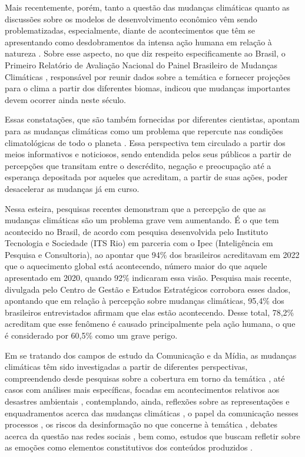 \documentclass[portuguese]{textolivre}
\begin{document}
Mais recentemente, porém, tanto a questão das mudanças climáticas quanto as discussões sobre os modelos de desenvolvimento econômico vêm sendo problematizadas, especialmente, diante de acontecimentos que têm se apresentando como desdobramentos da intensa ação humana em relação à natureza \cite{conti2011consideracoes,artaxo2020emergencias}. Sobre esse aspecto, no que diz respeito especificamente ao Brasil, o Primeiro Relatório de Avaliação Nacional do Painel Brasileiro de Mudanças Climáticas \cite{ambrizzi2014pbmc}, responsável por reunir dados sobre a temática e fornecer projeções para o clima a partir dos diferentes biomas, indicou que mudanças importantes devem ocorrer ainda neste século.

Essas constatações, que são também fornecidas por diferentes cientistas, apontam para as mudanças climáticas como um problema que repercute nas condições climatológicas de todo o planeta \cite{flores2018emociones,cartea2009comunicar}. Essa perspectiva tem circulado a partir dos meios informativos e noticiosos, sendo entendida pelos seus públicos a partir de percepções que transitam entre o descrédito, negação e preocupação \cite{almeida2019sociologia} até a esperança depositada por aqueles que acreditam, a partir de suas ações, poder desacelerar as mudanças já em curso.

Nessa esteira, pesquisas recentes demonstram que a percepção de que as mudanças climáticas são um problema grave vem aumentando. É o que tem acontecido no Brasil, de acordo com pesquisa desenvolvida pelo Instituto Tecnologia e Sociedade (ITS Rio) em parceria com o Ipec (Inteligência em Pesquisa e Consultoria), ao apontar que 94\% dos brasileiros acreditavam em 2022 que o aquecimento global está acontecendo, número maior do que aquele apresentado em 2020, quando 92\% indicaram essa visão. Pesquisa mais recente, divulgada pelo Centro de Gestão e Estudos Estratégicos \cite{cgee2024percepcao} corrobora esses dados, apontando que em relação à percepção sobre mudanças climáticas, 95,4\% dos brasileiros entrevistados afirmam que elas estão acontecendo. Desse total, 78,2\% acreditam que esse fenômeno é causado principalmente pela ação humana, o que é considerado por 60,5\% como um grave perigo.

Em se tratando dos campos de estudo da Comunicação e da Mídia, as mudanças climáticas têm sido investigadas a partir de diferentes perspectivas, compreendendo desde pesquisas sobre a cobertura em torno da temática \cite{loose2017jornalismo,rodas2017midia}, até casos com análises mais específicas, focadas em acontecimentos relativos aos desastres ambientais \cite{bueno2017cobertura,mancuso2010enchentes}, contemplando, ainda, reflexões sobre as representações e enquadramentos acerca das mudanças climáticas \cite{campos2021desmatamento}, o papel da comunicação nesses processos \cite{rodas2017midia}, os riscos da desinformação no que concerne à temática \cite{treen2020misinformation,santini2022negacionismo}, debates acerca da questão nas redes sociais \cite{evangelista2024narrativas,basch2021tiktok,balbe2016mudancas}, bem como, estudos que buscam refletir sobre as emoções como elementos constitutivos dos conteúdos produzidos \cite{brosch2021affect,roeser2012risk,lu2015incidental}.
\end{document}
